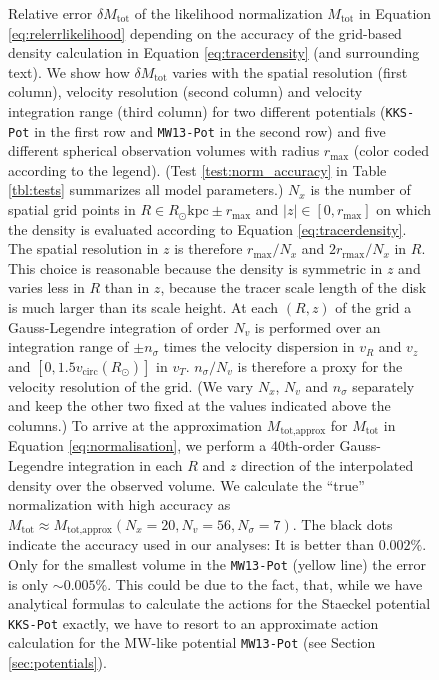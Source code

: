 

\begin{figure}
\centering
{}
\caption{Relative error  $\delta M_\text{tot}$ of the likelihood normalization $M_\text{tot}$ in Equation \ref{eq:relerrlikelihood} depending on the accuracy of the grid-based density calculation in Equation \ref{eq:tracerdensity} (and surrounding text). We show how $\delta M_\text{tot}$ varies with the spatial resolution (first column), velocity resolution (second column) and velocity integration range (third column) for two different potentials (\texttt{KKS-Pot} in the first row and \texttt{MW13-Pot} in the second row) and five different spherical observation volumes with radius $r_\text{max}$ (color coded according to the legend). (Test \ref{test:norm_accuracy} in Table \ref{tbl:tests} summarizes all model parameters.) $N_x$ is the number of spatial grid points in $R \in R_\odot \text{kpc} \pm r_\text{max}$ and $|z| \in [0,r_\text{max}]$ on which the density is evaluated according to Equation \ref{eq:tracerdensity}. The spatial resolution in $z$ is therefore $r_\text{max}/N_x$ and $2r_\text{rmax}/N_x$ in $R$. This choice is reasonable because the density is symmetric in $z$ and varies less in $R$ than in $z$, because the tracer scale length of the disk is much larger than its scale height. At each $(R,z)$ of the grid a Gauss-Legendre integration of order $N_v$ is performed over an integration range of $\pm n_\sigma$ times the velocity dispersion in $v_R$ and $v_z$ and $[0,1.5v_\text{circ}(R_\odot)]$ in $v_T$. $n_\sigma/N_v$ is therefore a proxy for the velocity resolution of the grid. (We vary $N_x$, $N_v$ and $n_\sigma$ separately and keep the other two fixed at the values indicated above the columns.) To arrive at the approximation $M_\text{tot,approx}$ for $M_\text{tot}$ in Equation \ref{eq:normalisation}, we perform a 40th-order Gauss-Legendre integration in each $R$ and $z$ direction of the interpolated density over the observed volume. We calculate the ``true'' normalization with high accuracy as $M_\text{tot} \approx M_\text{tot,approx}(N_x=20,N_v=56,N_\sigma=7)$. The black dots indicate the accuracy used in our analyses: It is better than $0.002\%$. Only for the smallest volume in the \texttt{MW13-Pot} (yellow line) the error is only $\sim 0.005\%$. This could be due to the fact, that, while we have analytical formulas to calculate the actions for the Staeckel potential \texttt{KKS-Pot} exactly, we have to resort to an approximate action calculation for the MW-like potential \texttt{MW13-Pot} (see Section \ref{sec:potentials}). }
\label{fig:norm_accuracy}
\end{figure}


